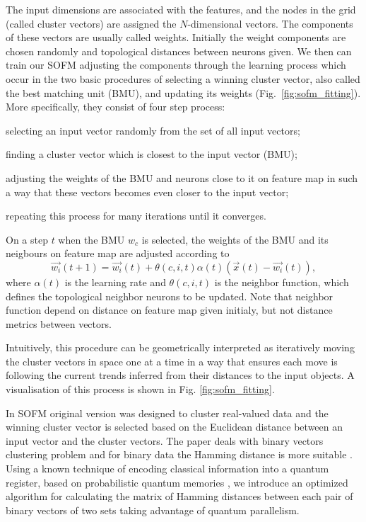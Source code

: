 \documentclass[pra,showkeys,twocolumn,showpacs]{revtex4-1}
\begin{document}
The input dimensions are associated with the features, 
and the nodes in the grid (called cluster vectors) are assigned the $N$-dimensional vectors. 
The components of these vectors are usually called weights. 
Initially the weight components are chosen randomly 
and topological distances between neurons given. 
We then can train our SOFM adjusting the components through the learning process which occur in the two basic procedures of 
selecting a winning cluster vector, also called the best matching unit (BMU), and updating its weights (Fig.~\ref{fig:sofm_fitting}). 
More specifically, they consist of four step process: 
\begin{enumerate*}
\item selecting an input vector randomly from the set of all input vectors; 
\item finding a cluster vector which is closest to the input vector (BMU); 
\item adjusting the weights of the BMU and neurons close to it on feature map in such a way 
	that these vectors  becomes even closer to the input vector; 
\item repeating this process for many iterations until it converges.
\end{enumerate*}


On a step $t$ when the BMU $w_{c}$ is selected, 
the weights of the BMU and its neigbours on feature map are adjusted according to
%
\begin{equation}
    \label{eq:learning}
	\vec{w_{i}}(t + 1) 
	= \vec{w_i}(t)
	+ \theta(c, i, t) \alpha(t) 
		\left(\vec{x}(t) - \vec{w_i}(t)\right),
\end{equation}
%
where  $\alpha(t)$ is the learning rate and $\theta(c, i, t)$ is the neighbor function,
which defines the topological neighbor neurons to be updated. 
Note that neighbor function depend on distance on feature map given initialy, 
but not distance metrics between vectors. 

Intuitively, this procedure can be geometrically interpreted as iteratively moving the cluster vectors in space one at a time in a way 
that ensures each move is following the current trends inferred from their distances to the input objects. 
A visualisation of this process is shown in Fig. \ref{fig:sofm_fitting}.

In SOFM original version was designed to cluster real-valued data
and the winning cluster vector is selected based on the Euclidean distance between an input vector and the cluster vectors.
The paper deals with binary vectors clustering problem 
and for binary data the Hamming distance is more suitable \cite{appiah2009, santana2017}.
Using a known technique of encoding classical information into a quantum register, 
based on probabilistic quantum memories \cite{trugenberger2001},
we introduce an optimized algorithm for calculating the matrix of Hamming distances 
between each pair of binary vectors  of two sets taking advantage of quantum parallelism.
\end{document}
